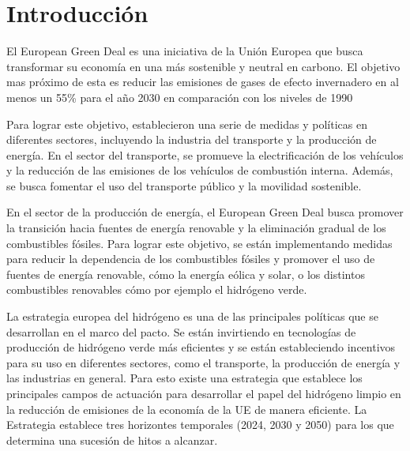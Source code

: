 
\chapter{Introducción}
\label{c1} %




El European Green Deal es una iniciativa de la Unión Europea que busca transformar su economía en una más sostenible y neutral en carbono. El objetivo mas próximo de esta es reducir las emisiones de gases de efecto invernadero en al menos un 55\% para el año 2030 en comparación con los niveles de 1990 
\vspace{2.5mm}

Para lograr este objetivo, establecieron una serie de medidas y políticas en diferentes sectores, incluyendo la industria del transporte y la producción de energía. En el sector del transporte, se promueve la electrificación de los vehículos y la reducción de las emisiones de los vehículos de combustión interna. Además, se busca fomentar el uso del transporte público y la movilidad sostenible.
\vspace{2.5mm}

En el sector de la producción de energía, el European Green Deal busca promover la transición hacia fuentes de energía renovable y la eliminación gradual de los combustibles fósiles. Para lograr este objetivo, se están implementando medidas para reducir la dependencia de los combustibles fósiles y promover el uso de fuentes de energía renovable, cómo la energía eólica y solar, o los distintos combustibles renovables cómo por ejemplo el hidrógeno verde.
\vspace{2.5mm}

La estrategia europea del hidrógeno es una de las principales políticas que se desarrollan en el marco del pacto. Se están invirtiendo en tecnologías de producción de hidrógeno verde más eficientes y se están estableciendo incentivos para su uso en diferentes sectores, como el transporte, la producción de energía y las industrias en general. Para esto existe una estrategia que establece los principales campos de actuación para desarrollar el papel del hidrógeno limpio en la reducción de emisiones de la economía de la UE de manera eficiente. La Estrategia establece tres horizontes temporales (2024, 2030 y 2050) para los que determina una sucesión de hitos a alcanzar.
\vspace{2.5mm}

